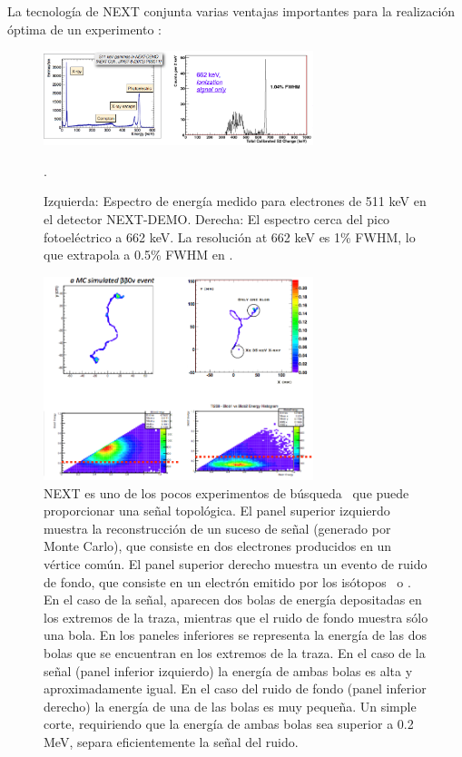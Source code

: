 La tecnología de NEXT conjunta varias ventajas importantes para la realización óptima de un experimento \bbonu:
                                    
\begin{figure}
\centering
\includegraphics[width=0.7\textwidth]{img/EResolution.png}
\caption{\small Izquierda: Espectro de energía medido para electrones de 511 keV en el detector NEXT-DEMO. Derecha: El espectro cerca del pico fotoeléctrico a 662 keV. La resolución at 662 keV es 1\% FWHM, lo que extrapola a 0.5\% FWHM en \Qbb.}
\label{fig.ERES}. 
\end{figure}

\begin{figure}
\centering
\includegraphics[width=0.7\textwidth]{img/Topo2.png}
\caption{\small NEXT es uno de los pocos experimentos de búsqueda \bbonu\ que puede proporcionar una señal topológica. El panel superior izquierdo muestra la reconstrucción de un suceso de señal (generado por Monte Carlo), que consiste en dos electrones producidos en un vértice común. El panel superior derecho muestra un evento de ruido de fondo, que consiste en un electrón emitido por los isótopos  \BI\ o \TL. En el caso de la señal, aparecen dos bolas de energía depositadas en los extremos de la traza, mientras que el ruido de fondo muestra sólo una bola. En los paneles inferiores se representa la energía de las dos bolas que se encuentran en los extremos de la traza. En el caso de la señal (panel inferior izquierdo) la energía de ambas bolas es alta y aproximadamente igual. En el caso del ruido de fondo (panel inferior derecho) la energía de una de las bolas es muy pequeña. Un simple corte, requiriendo que la energía de ambas bolas sea superior a 0.2 MeV, separa eficientemente la señal del ruido.}\label{fig.ETRK2}
\end{figure}

